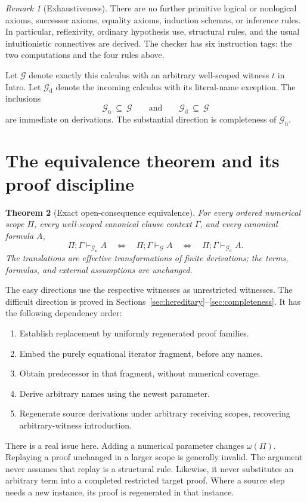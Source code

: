 \documentclass[11pt]{article}
\newtheorem{theorem}{Theorem}[section]
\theoremstyle{definition}\newtheorem{definition}[theorem]{Definition}
\theoremstyle{remark}\newtheorem{remark}[theorem]{Remark}
\newcommand{\G}{\mathcal G}
\newcommand{\Gn}{\mathcal G_{\mathrm n}}
\newcommand{\Gd}{\mathcal G_{\mathrm d}}
\newcommand{\wt}{\omega}
\begin{document}
\begin{remark}[Exhaustiveness]
There are no further primitive logical or nonlogical axioms, successor
axioms, equality axioms, induction schemas, or inference rules. In
particular, reflexivity, ordinary hypothesis use, structural rules, and
the usual intuitionistic connectives are derived. The checker has six
instruction tags: the two computations and the four rules above.
\end{remark}

Let $\G$ denote exactly this calculus with an arbitrary well-scoped
witness $t$ in Intro. Let $\Gd$ denote the incoming calculus with its
literal-name exception. The inclusions
\[
 \Gn\ \subseteq\ \G
 \qquad\text{and}\qquad \Gd\ \subseteq\ \G
\]
are immediate on derivations. The substantial direction is completeness
of $\Gn$.

\section{The equivalence theorem and its proof discipline}
\label{sec:main-theorem}

\begin{theorem}[Exact open-consequence equivalence]
\label{thm:main}
For every ordered numerical scope $\Pi$, every well-scoped canonical
clause context $\Gamma$, and every canonical formula $A$,
\[
 \Pi;\Gamma\vdash_{\Gn}A
 \quad\Longleftrightarrow\quad
 \Pi;\Gamma\vdash_{\G}A
 \quad\Longleftrightarrow\quad
 \Pi;\Gamma\vdash_{\Gd}A.
\]
The translations are effective transformations of finite derivations;
the terms, formulas, and external assumptions are unchanged.
\end{theorem}

The easy directions use the respective witnesses as unrestricted
witnesses. The difficult direction is proved in
Sections~\ref{sec:hereditary}--\ref{sec:completeness}. It has the following
dependency order:
\begin{enumerate}
\item Establish replacement by uniformly regenerated proof families.
\item Embed the purely equational iterator fragment, before any names.
\item Obtain predecessor in that fragment, without numerical coverage.
\item Derive arbitrary names using the newest parameter.
\item Regenerate source derivations under arbitrary receiving scopes,
      recovering arbitrary-witness introduction.
\end{enumerate}
There is a real issue here. Adding a numerical parameter changes
$\wt(\Pi)$. Replaying a proof unchanged in a larger scope is generally
invalid. The argument never assumes that replay is a structural rule.
Likewise, it never substitutes an arbitrary term into a completed
restricted target proof. Where a source step needs a new instance, its
proof is regenerated in that instance.
\end{document}
